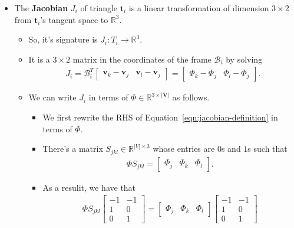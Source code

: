 \documentclass[10pt]{article}
\newcommand{\ve}[1]{\mathbf{#1}}
\newcommand{\ra}{\rightarrow}
\newcommand{\mcal}[1]{\mathcal{#1}}
\newcommand{\Real}{\mathbb{R}}
\begin{document}
\begin{itemize}
    \item The {\bf Jacobian} $J_i$ of triangle $\ve{t}_i$ is a linear transformation of dimension $3 \times 2$ from $\ve{t}_i$'s tangent space to $\Real^3$.
    \begin{itemize}
        \item So, it's signature is $J_i: T_i \ra \Real^3$.
        \item It is a $3 \times 2$ matrix in the coordinates of the frame $\mcal{B}_i$ by solving
        \begin{align}
            J_i = \mcal{B}_i^T \begin{bmatrix}
                \ve{v}_k - \ve{v}_j & \ve{v}_l - \ve{v}_j
            \end{bmatrix}
            = \begin{bmatrix}
                \Phi_k - \Phi_j & \Phi_l - \Phi_j
            \end{bmatrix}. \label{eqn:jacobian-definition}
        \end{align}
        \item We can write $J_i$ in terms of $\Phi \in \Real^{3 \times |\ve{V}|}$ as follows.
        \begin{itemize}
            \item We first rewrite the RHS of Equation~\eqref{eqn:jacobian-definition} in terms of $\Phi$.
            \item There's a matrix $S_{jkl} \in \Real^{|V| \times 3}$ whose entries are $0$s and $1$s such that
            \begin{align*}
                \Phi S_{jkl} = \begin{bmatrix} \Phi_j & \Phi_k & \Phi_l \end{bmatrix}.
            \end{align*}
            \item As a resulit, we have that
            \begin{align*}
                \Phi S_{jkl} \begin{bmatrix} -1 & -1 \\ 1 & 0 \\ 0 & 1 \end{bmatrix} 
                = \begin{bmatrix} \Phi_j & \Phi_k & \Phi_l \end{bmatrix} \begin{bmatrix} -1 & -1 \\ 1 & 0 \\ 0 & 1 \end{bmatrix}

\end{align*}
\end{itemize}
\end{itemize}
\end{itemize}
\end{document}
